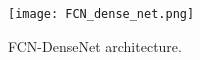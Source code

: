%
\begin{figure} [h!]
	\begin{center}
		\texttt{[image: FCN\_dense\_net.png]}
	\end{center}
	\caption{FCN-DenseNet architecture.} 
	\label{fcn}
\end{figure}

